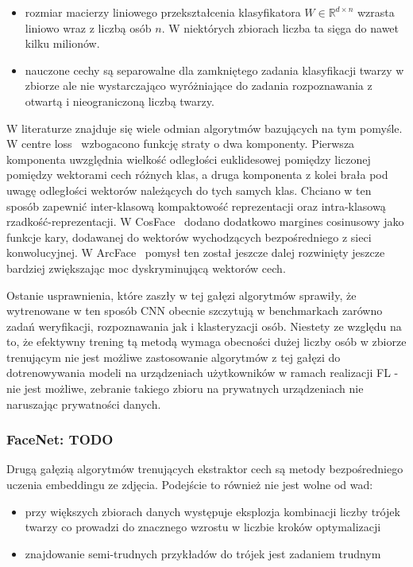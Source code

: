 \begin{itemize}
  \item rozmiar macierzy liniowego przekształcenia klasyfikatora \(W \in \mathbb{R}^{d \times n}\) wzrasta liniowo wraz z liczbą osób \(n\). W niektórych zbiorach liczba ta sięga do nawet kilku milionów. 
  \item nauczone cechy są separowalne dla zamkniętego zadania klasyfikacji twarzy w zbiorze ale nie wystarczająco wyróżniające do zadania rozpoznawania z otwartą i nieograniczoną liczbą twarzy.
\end{itemize}

W literaturze znajduje się wiele odmian algorytmów bazujących na tym pomyśle. W centre
loss~\cite{Centreloss} wzbogacono funkcję straty o dwa komponenty. Pierwsza komponenta uwzględnia
wielkość odległości euklidesowej pomiędzy liczonej pomiędzy wektorami cech różnych klas, a druga
komponenta z kolei brała pod uwagę odległości wektorów należących do tych samych klas. Chciano w
ten sposób zapewnić inter-klasową kompaktowość reprezentacji oraz intra-klasową
rzadkość-reprezentacji. W CosFace~\cite{Cosface} dodano dodatkowo margines cosinusowy jako funkcje
kary, dodawanej do wektorów wychodzących bezpośredniego z sieci konwolucyjnej. W
ArcFace~\cite{Arcface} pomysł ten został jeszcze dalej rozwinięty jeszcze bardziej zwiększając moc
dyskryminującą wektorów cech. 

Ostanie usprawnienia, które zaszły w tej gałęzi algorytmów sprawiły, że wytrenowane w ten sposób CNN obecnie szczytują  w benchmarkach zarówno zadań weryfikacji, rozpoznawania jak i klasteryzacji osób. Niestety ze względu na to, że efektywny trening tą metodą wymaga obecności dużej liczby osób w zbiorze trenującym nie jest możliwe zastosowanie algorytmów z tej gałęzi do dotrenowywania modeli na urządzeniach użytkowników w ramach realizacji FL - nie jest możliwe, zebranie takiego zbioru na prywatnych urządzeniach nie naruszając prywatności danych.

\subsubsection{FaceNet: TODO}\label{sec:tripletloss}
Drugą gałęzią algorytmów trenujących ekstraktor cech są metody bezpośredniego uczenia embeddingu ze zdjęcia.
Podejście to również nie jest wolne od wad:
\begin{itemize}
  \item przy większych zbiorach danych występuje eksplozja kombinacji liczby trójek twarzy co prowadzi do znacznego wzrostu w liczbie kroków optymalizacji 
  \item znajdowanie semi-trudnych przykładów do trójek jest zadaniem trudnym 
\end{itemize}

